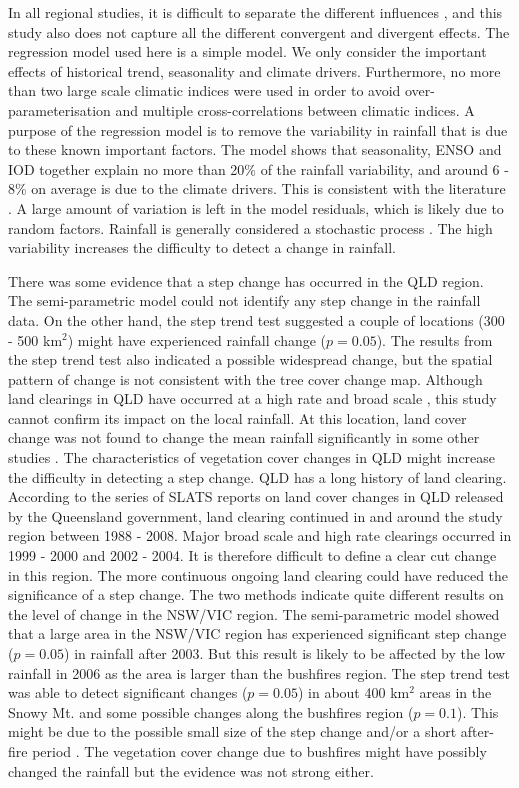 \documentclass[onecolumn,referee]{svjour3}
\begin{document}
In all regional studies, it is difficult to separate the different influences \citep{CEBON2000211}, and this study also does not capture all the different convergent and divergent effects. The regression model used here is a simple model. We only consider the important effects of historical trend, seasonality and climate drivers. Furthermore, no more than two large scale climatic indices were used in order to avoid over-parameterisation and multiple cross-correlations between climatic indices. A purpose of the regression model is to remove the variability in rainfall that is due to these known important factors. The model shows that seasonality, ENSO and IOD together explain no more than 20\% of the rainfall variability, and around 6 - 8\% on average is due to the climate drivers. This is consistent with the literature \citep[e.g.][]{Westra2010}. A large amount of variation is left in the model residuals, which is likely due to random factors. Rainfall is generally considered a stochastic process \citep[e.g.][]{Fowler2005,Cowpertwait2009,Burton2010}. The high variability increases the difficulty to detect a change in rainfall. 

There was some evidence that a step change has occurred in the QLD region. The semi-parametric model could not identify any step change in the rainfall data. On the other hand, the step trend test suggested a couple of locations (300 - 500 km$^2$) might have experienced rainfall change ($p = 0.05$). The results from the step trend test also indicated a possible widespread change, but the spatial pattern of change is not consistent with the tree cover change map. Although land clearings in QLD have occurred at a high rate and broad scale \citep{SLATS2005}, this study cannot confirm its impact on the local rainfall. At this location, land cover change was not found to change the mean rainfall significantly in some other studies \citep[e.g.][]{Narisma2003,McAlpine2007}. The characteristics of vegetation cover changes in QLD might increase the difficulty in detecting a step change. QLD has a long history of land clearing. According to the series of SLATS reports on land cover changes in QLD released by the Queensland government, land clearing continued in and around the study region between 1988 - 2008. Major broad scale and high rate clearings occurred in 1999 - 2000 and 2002 - 2004. It is therefore difficult to define a clear cut change in this region. The more continuous ongoing land clearing could have reduced the significance of a step change. 
The two methods indicate quite different results on the level of change in the NSW/VIC region. The semi-parametric model showed that a large area in the NSW/VIC region has experienced significant step change ($p = 0.05$) in rainfall after 2003. But this result is likely to be affected by the low rainfall in 2006 as the area is larger than the bushfires region. The step trend test was able to detect significant changes ($p = 0.05$) in about 400 km$^2$ areas in the Snowy Mt. and some possible changes along the bushfires region ($p = 0.1$). This might be due to the possible small size of the step change and/or a short after-fire period \citep{Hirsch1985}. The vegetation cover change due to bushfires might have possibly changed the rainfall but the evidence was not strong either. 
\end{document}
